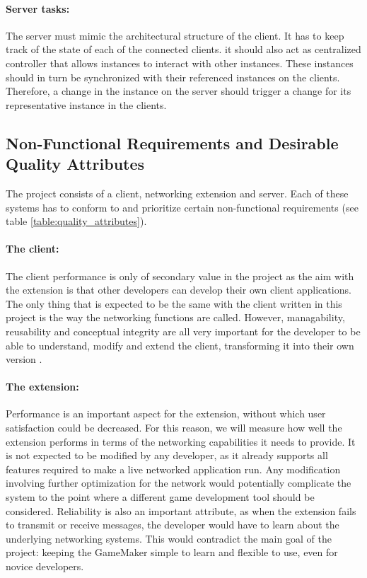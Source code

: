 \documentclass[bsc, 12pt, twoside, singlespacing, parskip, abbrevs, notimes, normalheadings, logo]{styles/infthesis}
\begin{document}
\paragraph*{Server tasks:}
The server must mimic the architectural structure of the client. It has to keep track of the state of each of the connected clients. it should also act as centralized controller that allows instances to interact with other instances. These instances should in turn be synchronized with their referenced instances on the clients. Therefore, a change in the instance on the server should trigger a change for its representative instance in the clients.


\subsection{Non-Functional Requirements and Desirable Quality Attributes}
The project consists of a client, networking extension and server. Each of these systems has to conform to and prioritize certain non-functional requirements (see table \ref{table:quality_attributes}).

\paragraph*{The client:}
The client performance is only of secondary value in the project as the aim with the extension is that other developers can develop their own client applications. The only thing that is expected to be the same with the client written in this project is the way the networking functions are called. However, managability, reusability and conceptual integrity are all very important for the developer to be able to understand, modify and extend the client, transforming it into their own version \cite{Friendly_Programming}.

\paragraph*{The extension:}
Performance is an important aspect for the extension, without which user satisfaction could be decreased. For this reason, we will measure how well the extension performs in terms of the networking capabilities it needs to provide. It is not expected to be modified by any developer, as it already supports all features required to make a live networked application run. Any modification involving further optimization for the network would potentially complicate the system to the point where a different game development tool should be considered. Reliability is also an important attribute, as when the extension fails to transmit or receive messages, the developer would have to learn about the underlying networking systems. This would contradict the main goal of the project: keeping the GameMaker simple to learn and flexible to use, even for novice developers.
\end{document}
